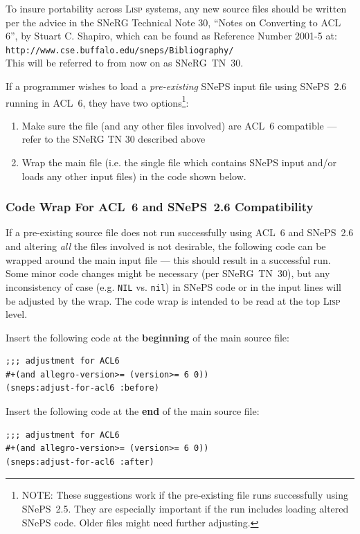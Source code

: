 \documentclass{book}
\begin{document}
To insure portability across \textsc{Lisp} systems, any new source
files should be written per the advice in the SNeRG Technical Note 30,
``Notes on Converting to ACL 6'', by Stuart C. Shapiro, which can be
found as Reference Number 2001-5 at:\\
\texttt{http://www.cse.buffalo.edu/sneps/Bibliography/}\\
This will be referred to from now on as SNeRG~TN~30.


If a programmer wishes to load a \emph{pre-existing} SNePS input file using  SNePS~2.6 running in ACL~6, they have two options\footnote{NOTE: These suggestions work if the pre-existing file runs successfully using SNePS~2.5. They are especially important if the run includes loading altered SNePS code.  Older files might need further adjusting.}:
\begin{enumerate}
\item Make sure  the  file (and any other files involved) are ACL~6 compatible --- refer to the SNeRG TN 30 described above
\item Wrap the main file (i.e. the single file which contains SNePS input and/or loads any other input files) in the code shown below. 
\end{enumerate}

\subsubsection{Code Wrap For ACL~6 and SNePS~2.6 Compatibility}

If a pre-existing source file does not run successfully using ACL~6
and SNePS~2.6 and altering \emph{all} the files involved is not
desirable, the following code can be wrapped around the main input
file --- this should result in a successful run. Some minor code
changes might be necessary (per SNeRG~TN~30), but any inconsistency of
case (e.g. \texttt{NIL} vs. \texttt{nil}) in SNePS code or in the
input lines will be adjusted by the wrap. The code wrap is intended to
be read at the top \textsc{Lisp} level.

Insert the following code at the {\bf beginning} of the main source file:
\begin{verbatim} 
;;; adjustment for ACL6 
#+(and allegro-version>= (version>= 6 0))
(sneps:adjust-for-acl6 :before)
\end{verbatim}

Insert the following code  at the {\bf end} of the main source file:
\begin{verbatim}
;;; adjustment for ACL6 
#+(and allegro-version>= (version>= 6 0))
(sneps:adjust-for-acl6 :after) 
\end{verbatim}
\end{document}
